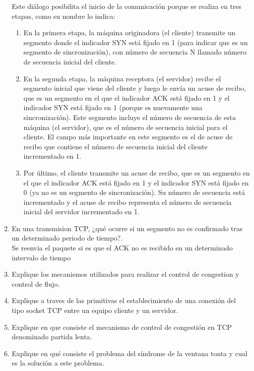 \documentclass{udparticle}
\begin{document}
\begin{enumerate}
\begin{enumerate}
\end{enumerate}
Este diálogo posibilita el inicio de la comunicación porque se realiza en tres etapas, como su nombre lo indica:
\begin{enumerate}
\item En la primera etapa, la máquina originadora (el cliente) transmite un segmento donde el indicador SYN está fijado en 1 (para indicar que es un segmento de sincronización), con número de secuencia N llamado número de secuencia inicial del cliente.
\item En la segunda etapa, la máquina receptora (el servidor) recibe el segmento inicial que viene del cliente y luego le envía un acuse de recibo, que es un segmento en el que el indicador ACK está fijado en 1 y el indicador SYN está fijado en 1 (porque es nuevamente una sincronización). Este segmento incluye el número de secuencia de esta máquina (el servidor), que es el número de secuencia inicial para el cliente. El campo más importante en este segmento es el de acuse de recibo que contiene el número de secuencia inicial del cliente incrementado en 1.
\item Por último, el cliente transmite un acuse de recibo, que es un segmento en el que el indicador ACK está fijado en 1 y el indicador SYN está fijado en 0 (ya no es un segmento de sincronización). Su número de secuencia está incrementado y el acuse de recibo representa el número de secuencia inicial del servidor incrementado en 1.
\end{enumerate}

\item En una transmision TCP, ¿qué ocurre si un segmento no es 
confirmado tras un determinado periodo de tiempo?.\\
Se reenvia el paquete si es que el ACK no es recibido en un determinado intervalo de tiempo
\item Explique los mecanismos utilizados para realizar el control de 
congestion y control de flujo.
\item Explique a traves de las primitivas el establecimiento de una 
conexión del tipo socket TCP entre un equipo cliente y un servidor.
\item Explique en que consiste el mecanismo de control de congestión en
TCP denominado partida lenta.
\item Explique en qué consiste el problema del síndrome de la ventana 
tonta y cual es la solución a este problema.
\end{enumerate}
\end{document}

